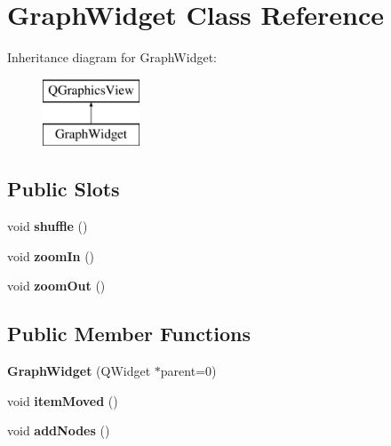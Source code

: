 \hypertarget{class_graph_widget}{}\section{Graph\+Widget Class Reference}
\label{class_graph_widget}
Inheritance diagram for Graph\+Widget\+:\begin{figure}[H]
\begin{center}
\leavevmode
\includegraphics[height=2.000000cm]{class_graph_widget}
\end{center}
\end{figure}
\subsection*{Public Slots}
\begin{DoxyCompactItemize}
\item 
\mbox{\label{class_graph_widget_a1905fe84eb39f020b32c58baf7a76758}} 
void {\bfseries shuffle} ()
\item 
\mbox{\label{class_graph_widget_a7d7e315e34a66d9a66022d31635e7aca}} 
void {\bfseries zoom\+In} ()
\item 
\mbox{\label{class_graph_widget_a72d29d38d8dd2c091cdd7078e1364f25}} 
void {\bfseries zoom\+Out} ()
\end{DoxyCompactItemize}
\subsection*{Public Member Functions}
\begin{DoxyCompactItemize}
\item 
\mbox{\label{class_graph_widget_ab86e8212d64bdbc286bff85355f95a88}} 
{\bfseries Graph\+Widget} (Q\+Widget $\ast$parent=0)
\item 
\mbox{\label{class_graph_widget_ae77c479470c6917c7dd717734320bde4}} 
void {\bfseries item\+Moved} ()
\item 
\mbox{\label{class_graph_widget_a951da489ddad2bc3b6c84cf48271299a}} 
void {\bfseries add\+Nodes} ()
\end{DoxyCompactItemize}
